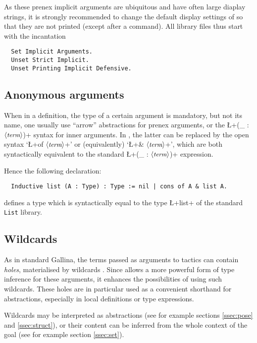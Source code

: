 As these prenex implicit arguments are ubiquitous and have often large
diaplay strings, it is strongly recommended to change the default
display settings of \Coq{} so that they are not printed (except after a
 command).
All \ssr{} library files thus start with the incantation
\begin{lstlisting}
  Set Implicit Arguments.
  Unset Strict Implicit.
  Unset Printing Implicit Defensive.
\end{lstlisting}

\subsection{Anonymous arguments}
When in a definition, the type of a certain argument is mandatory, but
not its name, one usually use ``arrow'' abstractions for prenex
arguments, or the \L+(_ : $\langle\mbox{\itshape\rmfamily\small term}\rangle$)+ syntax for inner arguments.
In \ssr{}, the latter can be replaced by the open syntax `\L+of $\langle\mbox{\itshape\rmfamily\small term}\rangle$+'
or (equivalently)  `\L+& $\langle\mbox{\itshape\rmfamily\small term}\rangle$+', which are both syntactically
equivalent to the standard \Coq{} \L+(_ : $\langle\mbox{\itshape\rmfamily\small term}\rangle$)+ expression.

Hence the following declaration:
\begin{lstlisting}
  Inductive list (A : Type) : Type := nil | cons of A & list A.
\end{lstlisting}
defines a type which is syntactically equal to the type \L+list+ of
the \Coq{} standard {\tt List} library.


\subsection{Wildcards}\label{ssec:wild}

As in standard Gallina, the terms passed as arguments
to \ssr{} tactics can contain \emph{holes}, materialised by wildcards
\C{_}.
Since \ssr{} allows a more powerful form of type inference for these
arguments, it enhances the possibilities of using such wildcards.
These holes are in particular used as a convenient shorthand for
abstractions, especially in local definitions or type expressions.

Wildcards may be interpreted as abstractions (see for example sections
\ref{ssec:pose} and \ref{ssec:struct}), or their content can be
inferred from the whole
context of the goal (see for example section \ref{ssec:set}).
